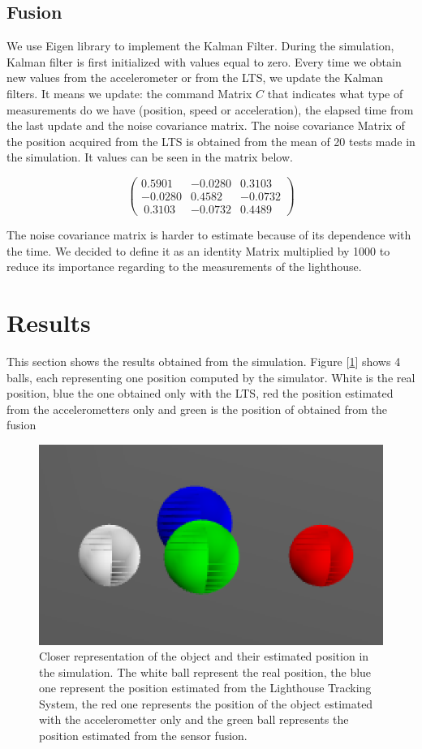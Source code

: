 \documentclass{vldb}
\begin{document}
\subsection{Fusion} \label{Fusion} 

We use Eigen library to implement the Kalman Filter. During the simulation, Kalman filter is first initialized with values equal to zero. Every time we obtain new values from the accelerometer or from the LTS, we update the Kalman filters. It means we update: the command Matrix $C$ that indicates what type of measurements do we have (position, speed or acceleration), the elapsed time from the last update and the noise covariance matrix. \newline
The noise covariance Matrix of the position acquired from the LTS is obtained from the mean of 20 tests made in the simulation. It values can be seen in the matrix below.

$$\begin{pmatrix}
0.5901 & -0.0280 & 0.3103 \\
-0.0280 & 0.4582 & -0.0732 \\\
0.3103 & -0.0732 & 0.4489
\end{pmatrix}$$

The noise covariance matrix is harder to estimate because of its dependence with the time. We decided to define it as an identity Matrix multiplied by 1000 to reduce its importance regarding to the measurements of the lighthouse.
\section{Results} \label{Res}
This section shows the results obtained from the simulation. Figure [\ref{im:visu}] shows 4 balls, each representing one position computed by the simulator. White is the real position, blue the one obtained only with the LTS, red the position estimated from the accelerometters only and green is the position of obtained from the fusion
\begin{figure}[h!]
  \includegraphics[scale = 0.65]{Image/Visulaisation.png}
  \caption{Closer representation of the object and their estimated position in the simulation. The white ball represent the real position, the blue one represent the position estimated from the Lighthouse Tracking System, the red one represents the position of the object estimated with the accelerometter only and the green ball represents the position estimated from the sensor fusion.}
  \label{im:visu}
\end{figure}
\end{document}
